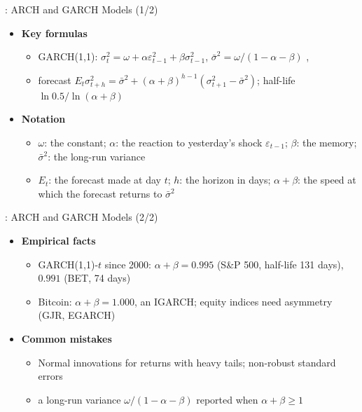 \begin{frame}{: ARCH and GARCH Models (1/2)}
\itemsize{\small}
\begin{itemize}
    \item \textbf{Key formulas}
    \begin{itemize}
        \item GARCH(1,1): $\sigma_t^2 = \omega + \alpha\varepsilon_{t-1}^2 + \beta\sigma_{t-1}^2$, $\bar\sigma^2 = \omega/(1 - \alpha - \beta)$ , 
        \item forecast $E_t\sigma_{t+h}^2 = \bar\sigma^2 + (\alpha + \beta)^{h-1}(\sigma_{t+1}^2 - \bar\sigma^2)$; half-life $\ln 0.5/\ln(\alpha + \beta)$
    \end{itemize}
    \item \textbf{Notation}
    \begin{itemize}
        \item $\omega$: the constant; $\alpha$: the reaction to yesterday's shock $\varepsilon_{t-1}$; $\beta$: the memory; $\bar\sigma^2$: the long-run variance
        \item $E_t$: the forecast made at day $t$; $h$: the horizon in days; $\alpha + \beta$: the speed at which the forecast returns to $\bar\sigma^2$
    \end{itemize}
\end{itemize}
\end{frame}

\begin{frame}{: ARCH and GARCH Models (2/2)}
\itemsize{\small}
\begin{itemize}
    \item \textbf{Empirical facts}
    \begin{itemize}
        \item GARCH(1,1)-$t$ since 2000: $\alpha + \beta = 0.995$ (S\&P 500, half-life 131 days), $0.991$ (BET, 74 days)
        \item Bitcoin: $\alpha + \beta = 1.000$, an IGARCH; equity indices need asymmetry (GJR, EGARCH)
    \end{itemize}
    \item \textbf{Common mistakes}
    \begin{itemize}
        \item Normal innovations for returns with heavy tails; non-robust standard errors
        \item a long-run variance $\omega/(1 - \alpha - \beta)$ reported when $\alpha + \beta \ge 1$
    \end{itemize}
\end{itemize}
\end{frame}

